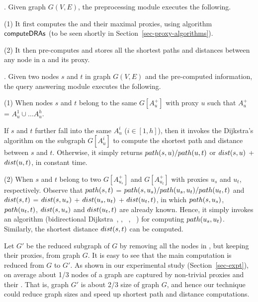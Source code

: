 . Given graph $G(V, E)$, the preprocessing module executes the following.

\noindent(1) It first computes the \dras and their maximal proxies,  using algorithm ${\mathsf{computeDRAs}}$ (to be seen shortly in Section~\ref{sec-proxy-algorithms}).

\noindent(2) It then pre-computes and stores all the shortest paths and distances between any node in a \dra and its proxy.


. Given two nodes $s$ and $t$ in graph $G(V, E)$  and the pre-computed information, the query answering module executes the following.


\noindent(1) When nodes $s$ and $t$ belong to the same \dra $G[A^+_u]$ with proxy $u$ such that $A^+_u$ = $A^1_u\cup\ldots A^h_u$.

If $s$ and $t$ further fall into the same $A^i_u$ ($i\in[1,h]$), then it invokes the Dijkstra's algorithm on the subgraph $G[A^i_u]$ to compute the shortest path and distance between $s$ and $t$. Otherwise, it simply returns $\path(s, u)/\path(u, t)$ or $\dist(s, u)$ + $\dist(u, t)$, in constant time.

\noindent(2)  When $s$ and $t$ belong to two \dras $G[A^+_{u_s}]$ and $G[A^+_{u_t}]$ with proxies $u_s$ and $u_t$, respectively.
%
Observe that $\path(s, t)$ = $\path(s, u_s)/\path(u_s, u_t)/\path(u_t, t)$ and $\dist(s, t)$ = $\dist(s, u_s)$ + $\dist(u_s, u_t)$ + $\dist(u_t, t)$, in which $\path(s, u_s)$, $\path(u_t, t)$, $\dist(s, u_s)$ and $\dist(u_t, t)$ are already known. Hence, it simply invokes an algorithm (\eg bidirectional Dijkstra~\cite{LubyR89}, \arcflag \cite{MohringSSWW05}, \ch~\cite{GeisbergerSSD08}, \tnr~\cite{bast2014route}) for computing $\path(u_s, u_t)$.
Similarly, the shortest distance $\dist(s, t)$ can be computed.

 Let $G'$ be the reduced subgraph of $G$ by removing all the nodes in \dras, but keeping their proxies, from graph $G$. It is easy to see that the main computation is reduced from $G$ to $G'$.   As shown in our experimental study (Section~\ref{sec-expt}), on average about 1/3 nodes of a graph are captured by non-trivial proxies and their \dras. That is, graph $G'$ is about 2/3 size of graph $G$, and hence our technique could reduce graph sizes and speed up shortest path and distance computations.
